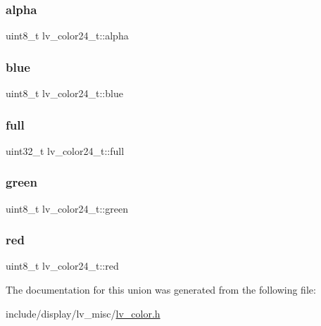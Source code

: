 \subsubsection{\texorpdfstring{alpha}{alpha}}
{\footnotesize\ttfamily uint8\+\_\+t lv\+\_\+color24\+\_\+t\+::alpha}

\mbox{\label{unionlv__color24__t_aeb4ffbb0b3a0400da9755fa6ddb2fb98}} 
\subsubsection{\texorpdfstring{blue}{blue}}
{\footnotesize\ttfamily uint8\+\_\+t lv\+\_\+color24\+\_\+t\+::blue}

\mbox{\label{unionlv__color24__t_a135b69f280735fd94beafa33f8853c14}} 
\subsubsection{\texorpdfstring{full}{full}}
{\footnotesize\ttfamily uint32\+\_\+t lv\+\_\+color24\+\_\+t\+::full}

\mbox{\label{unionlv__color24__t_a9319cf96aea737304b8908916292fd08}} 
\subsubsection{\texorpdfstring{green}{green}}
{\footnotesize\ttfamily uint8\+\_\+t lv\+\_\+color24\+\_\+t\+::green}

\mbox{\label{unionlv__color24__t_a582646ae95cac3a814f33f8e880ebc0b}} 
\subsubsection{\texorpdfstring{red}{red}}
{\footnotesize\ttfamily uint8\+\_\+t lv\+\_\+color24\+\_\+t\+::red}



The documentation for this union was generated from the following file\+:\begin{DoxyCompactItemize}
\item 
include/display/lv\+\_\+misc/\mbox{\hyperlink{lv__color_8h}{lv\+\_\+color.\+h}}\end{DoxyCompactItemize}

